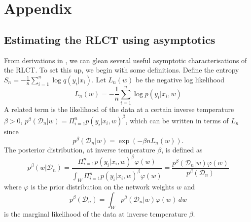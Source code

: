 \documentclass{article} %
\begin{document}
%





\appendix
\section{Appendix}

\subsection{Estimating the RLCT using asymptotics}
\label{appendix:RLCT_estimation}

From derivations in \citep{watanabe_widely_2013}, we can glean several useful asymptotic characterisations of the RLCT. To set this up, we begin with some definitions. Define the entropy $S_n = -\frac{1}{n} \sum_{i=1}^n \log q(y_i|x_i)$.
Let $L_n(w)$ be the negative log likelihood
\[
L_n(w) = -\frac{1}{n} \sum_{i=1}^n \log p(y_i |x_i, w)
\]
A related term is the likelihood of the data at a certain inverse temperature $\beta >0$, $p^\beta(\mathcal D_n | w) = \Pi_{i=1}^n p(y_i |x_i, w)^\beta$, which can be written in terms of $L_n$ since
\begin{equation}
p^\beta(\mathcal D_n | w) = \exp(-\beta n L_n(w)).
\label{general_likelihood}
\end{equation}
The posterior distribution, at inverse temperature $\beta$, is defined as 
\begin{equation}
p^\beta(w|\mathcal D_n) = \frac{\Pi_{i=1}^n p(y_i|x_i,w)^\beta \varphi(w)}{\int_W \Pi_{i=1}^n p(y_i|x_i,w)^\beta \varphi(w)} = \frac{p^\beta(\mathcal D_n|w) \varphi(w)}{p^\beta(\mathcal D_n)}
\label{general_posterior}
\end{equation}
where $\varphi$ is the prior distribution on the network weights $w$ and
\begin{equation}
p^\beta(\mathcal D_n) = \int_W p^\beta(\mathcal D_n|w) \varphi(w) \,dw
\label{general_marginal_likelihood}
\end{equation}
is the marginal likelihood of the data at inverse temperature $\beta$. 
\end{document}
